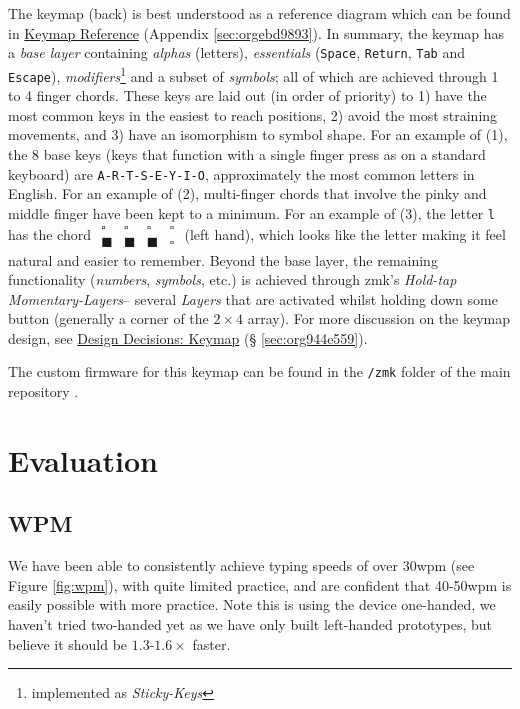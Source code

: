 \documentclass[logo,bsc,singlespacing,parskip]{infthesis}
\begin{document}
The keymap (back) is best understood as a reference diagram which can be found in
\hyperref[sec:orgebd9893]{Keymap Reference} (Appendix \ref{sec:orgebd9893}).
In summary, the keymap has a \emph{base layer} containing \emph{alphas} (letters), \emph{essentials} (\texttt{Space}, \texttt{Return}, \texttt{Tab} and \texttt{Escape}), \emph{modifiers}\footnote{implemented as \emph{Sticky-Keys}} and a subset of \emph{symbols}; all of which are achieved through 1 to 4 finger chords.
These keys are laid out (in order of priority) to 1) have the most common keys in the easiest to reach positions, 2) avoid the most straining movements, and 3) have an isomorphism to symbol shape.
For an example of (1), the 8 base keys (keys that function with a single finger press as on a standard keyboard) are  \texttt{A-R-T-S-E-Y-I-O}, approximately the most common letters in English.
For an example of (2), multi-finger chords that involve the pinky and middle finger have been kept to a minimum.
For an example of (3), the letter \texttt{l} has the chord \(\begin{matrix} \square & \square  & \square  & \square \\ \blacksquare &  \blacksquare & \blacksquare & \square \end{matrix}\) (left hand), which looks like the letter making it feel natural and easier to remember.
Beyond the base layer, the remaining functionality (\emph{numbers}, \emph{symbols}, etc.) is achieved through zmk's \autocite{ZMKFirmware}  \emph{Hold-tap} \emph{Momentary-Layers}-- several \emph{Layers} that are activated whilst holding down some button (generally a corner of the \(2\times4\) array).
For more discussion on the keymap design, see \hyperref[sec:org944e559]{Design Decisions: Keymap} (§ \ref{sec:org944e559}).

The custom firmware for this keymap can be found in the \texttt{/zmk} folder of the main repository \autocite{sharpNazzacodeHCIDMy}.
\section{Evaluation}
\label{sec:orgb450322}
\subsection{WPM}
\label{sec:orgf39674e}
We have been able to consistently achieve typing speeds of over 30wpm (see Figure \ref{fig:wpm}), with quite limited practice, and are confident that 40-50wpm is easily possible with more practice.
Note this is using the device one-handed, we haven't tried two-handed yet as we have only built left-handed prototypes, but believe it should be \(1.3\)-\(1.6\times\) faster.
\end{document}
